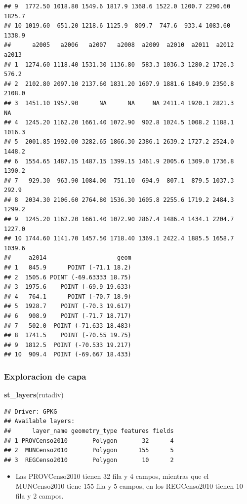 \documentclass[11pt,]{article}
\newenvironment{Shaded}{\begin{snugshade}}{\end{snugshade}}
\newcommand{\KeywordTok}[1]{\textcolor[rgb]{0.13,0.29,0.53}{\textbf{#1}}}
\newcommand{\NormalTok}[1]{#1}
\providecommand{\tightlist}{%
\setlength{\itemsep}{0pt}\setlength{\parskip}{0pt}}
\begin{document}
\begin{verbatim}
## 9  1772.50 1018.80 1549.6 1817.9 1368.6 1522.0 1200.7 2290.60 1825.7
## 10 1019.60  651.20 1218.6 1125.9  809.7  747.6  933.4 1083.60 1338.9
##      a2005   a2006   a2007   a2008  a2009  a2010  a2011  a2012  a2013
## 1  1274.60 1118.40 1531.30 1136.80  583.3 1036.3 1280.2 1726.3  576.2
## 2  2102.80 2097.10 2137.60 1831.20 1607.9 1881.6 1849.9 2350.8 2108.0
## 3  1451.10 1957.90      NA      NA     NA 2411.4 1920.1 2821.3     NA
## 4  1245.20 1162.20 1661.40 1072.90  902.8 1024.5 1008.2 1188.1 1016.3
## 5  2001.85 1992.00 3282.65 1866.30 2386.1 2639.2 1727.2 2524.0 1448.2
## 6  1554.65 1487.15 1487.15 1399.15 1461.9 2005.6 1309.0 1736.8 1390.2
## 7   929.30  963.90 1084.00  751.10  694.9  807.1  879.5 1037.3  292.9
## 8  2034.30 2106.60 2764.80 1536.30 1605.8 2255.6 1719.2 2484.3 1299.2
## 9  1245.20 1162.20 1661.40 1072.90 2867.4 1486.4 1434.1 2204.7 1227.0
## 10 1744.60 1141.70 1457.50 1718.40 1369.1 2422.4 1885.5 1658.7 1039.6
##     a2014                    geom
## 1   845.9      POINT (-71.1 18.2)
## 2  1505.6 POINT (-69.63333 18.75)
## 3  1975.6    POINT (-69.9 19.633)
## 4   764.1      POINT (-70.7 18.9)
## 5  1928.7    POINT (-70.3 19.617)
## 6   908.9    POINT (-71.7 18.717)
## 7   502.0  POINT (-71.633 18.483)
## 8  1741.5    POINT (-70.55 19.75)
## 9  1812.5  POINT (-70.533 19.217)
## 10  909.4  POINT (-69.667 18.433)
\end{verbatim}

\subsubsection{Exploracion de capa}\label{exploracion-de-capa}

\begin{Shaded}
\begin{Highlighting}[]
\KeywordTok{st_layers}\NormalTok{(rutadiv)}
\end{Highlighting}
\end{Shaded}

\begin{verbatim}
## Driver: GPKG 
## Available layers:
##      layer_name geometry_type features fields
## 1 PROVCenso2010       Polygon       32      4
## 2  MUNCenso2010       Polygon      155      5
## 3  REGCenso2010       Polygon       10      2
\end{verbatim}

\begin{itemize}
\tightlist
\item
  Las PROVCenso2010 tienen 32 fila y 4 campos, mientras que el
  MUNCenso2010 tiene 155 fila y 5 campos, en los REGCenso2010 tienen 10
  fila y 2 campos.
\end{itemize}
\end{document}
